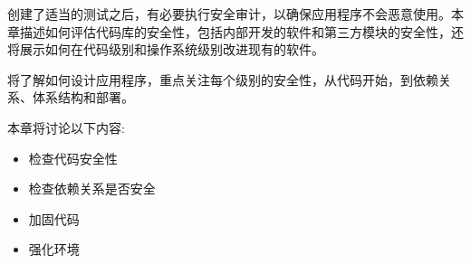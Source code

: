 
创建了适当的测试之后，有必要执行安全审计，以确保应用程序不会恶意使用。本章描述如何评估代码库的安全性，包括内部开发的软件和第三方模块的安全性，还将展示如何在代码级别和操作系统级别改进现有的软件。

将了解如何设计应用程序，重点关注每个级别的安全性，从代码开始，到依赖关系、体系结构和部署。

本章将讨论以下内容:

\begin{itemize}
\item 
检查代码安全性

\item 
检查依赖关系是否安全

\item 
加固代码

\item 
强化环境
\end{itemize}